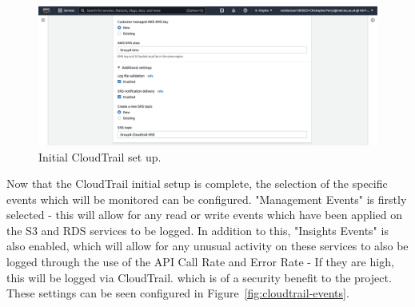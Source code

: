 \begin{figure}[!htbp]
    \centering
    \includegraphics[width=\textwidth]{resources/cloudtrail/cloudtrail-general-2}
    \caption{Initial CloudTrail set up.}
    \label{fig:cloudwatch-general-2}
\end{figure}

Now that the CloudTrail initial setup is complete, the selection of the specific events which will be monitored can be
configured.
"Management Events" is firstly selected - this will allow for any read or write events which have been applied on
the S3 and RDS services to be logged.
In addition to this, "Insights Events" is also enabled, which will allow for any unusual activity on these services to
also be logged through the use of the API Call Rate and Error Rate - If they are high, this will be logged via CloudTrail.
which is of a security benefit to the project.
These settings can be seen configured in Figure~\ref{fig:cloudtrail-events}.

